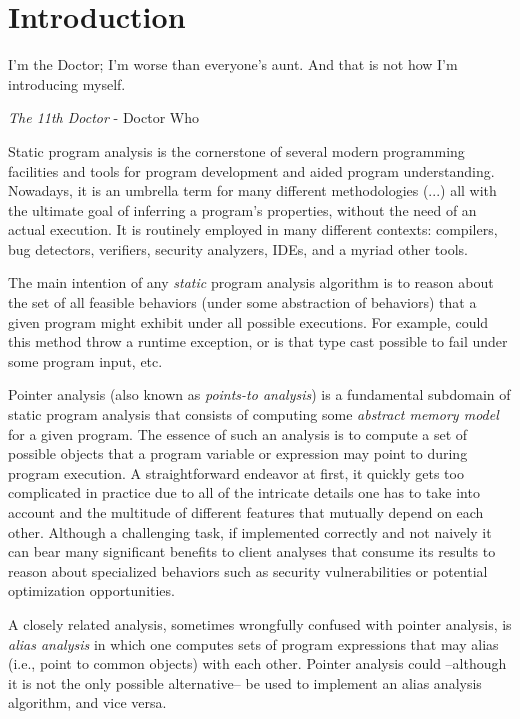 \chapter{Introduction}\label{chapter:intro}

\epigraph{I'm the Doctor; I'm worse than everyone's aunt. And that is not how I'm introducing myself.}{\textit{The 11th Doctor} - Doctor Who}

Static program analysis is the cornerstone of several modern programming
facilities and tools for program development and aided program understanding.
Nowadays, it is an umbrella term for many different methodologies (...) all
with the ultimate goal of inferring a program's properties, without the need of
an actual execution. It is routinely employed in many different contexts:
compilers, bug detectors, verifiers, security analyzers, IDEs, and a myriad
other tools.

The main intention of any \emph{static} program analysis algorithm is to reason
about the set of all feasible behaviors (under some abstraction of behaviors)
that a given program might exhibit under all possible executions. For example,
could this method throw a runtime exception, or is that type cast possible to
fail under some program input, etc.

Pointer analysis (also known as \emph{points-to analysis}) is a fundamental
subdomain of static program analysis that consists of computing some
\emph{abstract memory model} for a given program. The essence of such an
analysis is to compute a set of possible objects that a program variable or
expression may point to during program execution. A straightforward endeavor at
first, it quickly gets too complicated in practice due to all of the intricate
details one has to take into account and the multitude of different features
that mutually depend on each other. Although a challenging task, if implemented
correctly and not naively it can bear many significant benefits to client
analyses that consume its results to reason about specialized behaviors such as
security vulnerabilities or potential optimization opportunities.

A closely related analysis, sometimes wrongfully confused with pointer
analysis, is \emph{alias analysis} in which one computes sets of program
expressions that may alias (i.e., point to common objects) with each other.
Pointer analysis could --although it is not the only possible alternative-- be
used to implement an alias analysis algorithm, and vice versa.

